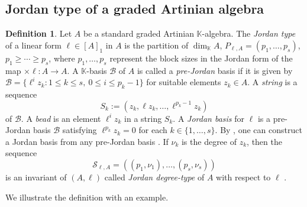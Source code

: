 \documentclass[12pt,twoside]{amsart}
\numberwithin{equation}{section} \hyphenation{semi-stable}
\newcommand{\K}{\mathbb{K}}
\theoremstyle{definition}
\newtheorem{definition}[theorem]{Definition}
\newcommand{\h}[1]{\-\mbox{-#1}}
\begin{document}

\subsection{Jordan type of a graded Artinian algebra}


\begin{definition} \label{jordanBasisDefinition} 
Let $A$ be a standard  graded Artinian $\K$-algebra. The \textit{Jordan type} of a linear form $\ell\in [A]_1$ in $A$ is the partition  of  $\dim_\K A$, $P_{\ell,A}=(p_1,\dots,p_s)$, $p_1 \ge \cdots \ge p_s$, where $p_1, \dots,p_s$ represent the block sizes in the Jordan  form of the map $\times \ell: A \longrightarrow A$. A $\K$-basis $\mathcal{B}$ of $A$ is called  a \textit{pre\h{Jordan}} basis if it is given by  $\mathcal{B}=\{\ell^iz_k:1\le k\le s, \ 0\le i \le p_k-1\}$ for suitable elements $z_k\in A$. A \textit{string} is a sequence
$$
S_k:=(z_k,\ell z_k,\dots, \ell^{p_k-1}z_k)
$$
of $\mathcal{B}$. A \textit{bead} is an element $\ell^iz_k$ in a string $S_k$. A \textit{Jordan basis} for $\ell$ is a pre\h{Jordan} basis $\mathcal{B}$ satisfying $\ell^{p_k}z_k=0$ for each $k\in\{1,\dots,s\}$. By  \cite[Lemma 2.2 (iii)]{IMM22}, one can construct a Jordan basis from any pre\h{Jordan} basis . 
If $\nu_k$ is the degree of $z_k$, then the sequence
\[
\mathcal{S}_{\ell,A}=((p_1,\nu_1),\dots,(p_s,\nu_s))
\]
is an invariant of $(A,\ell)$  called \textit{Jordan degree\h{type}} of $A$ with respect to $\ell$ \cite[Lemma 2.2(iv)]{IMM22}.
\end{definition}

 We illustrate the definition with an example.
\end{document}
